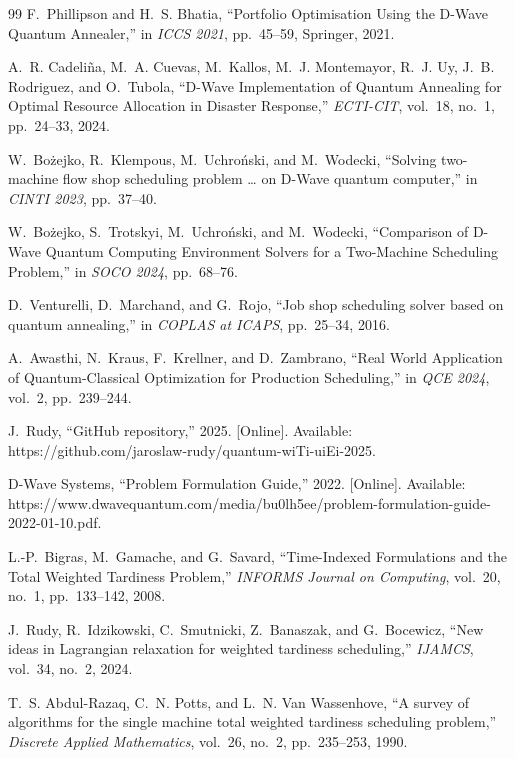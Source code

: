 \begin{thebibliography}{99}
F.~Phillipson and H.~S. Bhatia,
``Portfolio Optimisation Using the D-Wave Quantum Annealer,''
in \textit{ICCS 2021}, pp.~45--59, Springer, 2021.

A.~R. Cadeliña, M.~A. Cuevas, M.~Kallos, M.~J. Montemayor, R.~J. Uy, J.~B. Rodriguez, and O.~Tubola,
``D-Wave Implementation of Quantum Annealing for Optimal Resource Allocation in Disaster Response,''
\textit{ECTI-CIT}, vol.~18, no.~1, pp.~24--33, 2024.

W.~Bożejko, R.~Klempous, M.~Uchroński, and M.~Wodecki,
``Solving two-machine flow shop scheduling problem … on D-Wave quantum computer,''
in \textit{CINTI 2023}, pp.~37--40.

W.~Bożejko, S.~Trotskyi, M.~Uchroński, and M.~Wodecki,
``Comparison of D-Wave Quantum Computing Environment Solvers for a Two-Machine Scheduling Problem,''
in \textit{SOCO 2024}, pp.~68--76.

D.~Venturelli, D.~Marchand, and G.~Rojo,
``Job shop scheduling solver based on quantum annealing,''
in \textit{COPLAS at ICAPS}, pp.~25--34, 2016.

A.~Awasthi, N.~Kraus, F.~Krellner, and D.~Zambrano,
``Real World Application of Quantum-Classical Optimization for Production Scheduling,''
in \textit{QCE 2024}, vol.~2, pp.~239--244.

J.~Rudy,
``GitHub repository,'' 2025. [Online]. Available: https://github.com/jaroslaw-rudy/quantum-wiTi-uiEi-2025.

D-Wave Systems,
``Problem Formulation Guide,'' 2022. [Online]. Available: https://www.dwavequantum.com/media/bu0lh5ee/problem-formulation-guide-2022-01-10.pdf.

L.-P.~Bigras, M.~Gamache, and G.~Savard,
``Time-Indexed Formulations and the Total Weighted Tardiness Problem,''
\textit{INFORMS Journal on Computing}, vol.~20, no.~1, pp.~133--142, 2008.

J.~Rudy, R.~Idzikowski, C.~Smutnicki, Z.~Banaszak, and G.~Bocewicz,
``New ideas in Lagrangian relaxation for weighted tardiness scheduling,''
\textit{IJAMCS}, vol.~34, no.~2, 2024.

T.~S. Abdul-Razaq, C.~N. Potts, and L.~N. Van Wassenhove,
``A survey of algorithms for the single machine total weighted tardiness scheduling problem,''
\textit{Discrete Applied Mathematics}, vol.~26, no.~2, pp.~235--253, 1990.
\end{thebibliography}